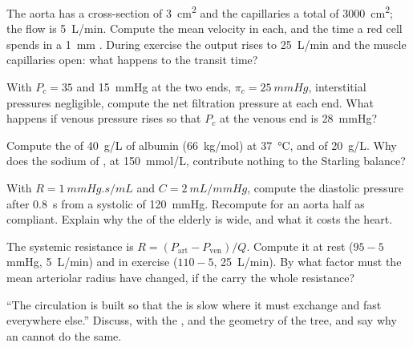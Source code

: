 \begin{exercise}[$\star\star$]\label{exo:b2:blood-circulation:7}
The aorta has a cross-section of \qty{3}{cm^2} and the capillaries a
total of \qty{3000}{cm^2}; the flow is \qty{5}{L/min}. Compute the
mean velocity in each, and the time a red cell spends in a
\qty{1}{mm} . During exercise the output rises to
\qty{25}{L/min} and the muscle capillaries open: what happens to the
transit time?
\end{exercise}

\begin{exercise}[$\star\star$]\label{exo:b2:blood-circulation:8}
With $P_c = 35$ and \qty{15}{mmHg} at the two ends, $\pi_c =
\qty{25}{mmHg}$, interstitial pressures negligible, compute the net
filtration pressure at each end. What happens if venous pressure
rises so that $P_c$ at the venous end is \qty{28}{mmHg}?
\end{exercise}

\begin{exercise}[$\star\star$]\label{exo:b2:blood-circulation:9}
Compute the  of \qty{40}{g/L} of albumin
(\qty{66}{kg/mol}) at \qty{37}{\celsius}, and of \qty{20}{g/L}. Why
does the sodium of , at \qty{150}{mmol/L}, contribute nothing
to the Starling balance?
\end{exercise}

\begin{exercise}[$\star\star\star$]\label{exo:b2:blood-circulation:10}
With $R = \qty{1}{mmHg.s/mL}$ and $C = \qty{2}{mL/mmHg}$, compute the
diastolic pressure after \qty{0.8}{s} from a systolic of
\qty{120}{mmHg}. Recompute for an aorta half as compliant. Explain why
the  of the elderly is wide, and what it costs the
heart.
\end{exercise}

\begin{exercise}[$\star\star\star$]\label{exo:b2:blood-circulation:11}
The systemic resistance is $R = (P_{\text{art}} - P_{\text{ven}})/Q$.
Compute it at rest ($95 - 5$ mmHg, \qty{5}{L/min}) and in exercise
($110 - 5$, \qty{25}{L/min}). By what factor must the mean arteriolar
radius have changed, if the  carry the whole resistance?
\end{exercise}

\begin{exercise}[$\star\star\star$]\label{exo:b2:blood-circulation:12}
``The circulation is built so that the  is slow where it must
exchange and fast everywhere else.'' Discuss, with the ,  and the geometry of the tree, and say
why an  cannot do the same.
\end{exercise}

